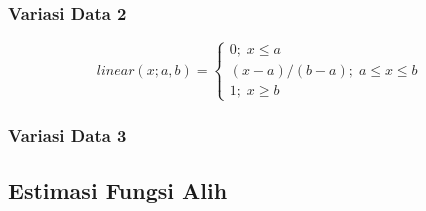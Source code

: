 \subsubsection{Variasi Data 2}
\lipsum[1]

\begin{equation}
	\label{eq liniernaik}
	linear(x; a,b) =
	\left\{\begin{matrix}
		0; \; x \leq a\\ 
		(x-a)/(b-a); \; a \leq x \leq b\\ 
		1; \; x \geq b
	\end{matrix}\right.
\end{equation}

\subsubsection{Variasi Data 3}
\lipsum[1]

\subsection{Estimasi Fungsi Alih}
\lipsum[1]

